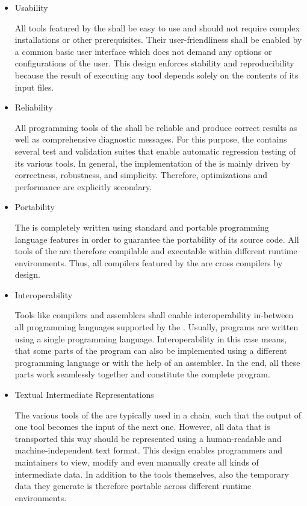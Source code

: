 \begin{itemize}

\item Usability\nopagebreak

All tools featured by the \ecs{} shall be easy to use and should not require complex installations or other prerequisites.
Their user-friendliness shall be enabled by a common basic user interface which does not demand any options or configurations of the user.
This design enforces stability and reproducibility because the result of executing any tool depends solely on the contents of its input files.

\item Reliability\nopagebreak

All programming tools of the \ecs{} shall be reliable and produce correct results as well as comprehensive diagnostic messages.
For this purpose, the \ecs{} contains several test and validation suites that enable automatic regression testing of its various tools.
In general, the implementation of the \ecs{} is mainly driven by correctness, robustness, and simplicity.
Therefore, optimizations and performance are explicitly secondary.

\item Portability\nopagebreak

The \ecs{} is completely written using standard and portable programming language features in order to guarantee the portability of its source code.
All tools of the \ecs{} are therefore compilable and executable within different runtime environments.
Thus, all compilers featured by the \ecs{} are cross compilers by design.

\item Interoperability\nopagebreak

Tools like compilers and assemblers shall enable interoperability in-between all programming languages supported by the \ecs{}.
Usually, programs are written using a single programming language.
Interoperability in this case means, that some parts of the program can also be implemented using a different programming language or with the help of an assembler.
In the end, all these parts work seamlessly together and constitute the complete program.

\item Textual Intermediate Representations\nopagebreak

The various tools of the \ecs{} are typically used in a chain, such that the output of one tool becomes the input of the next one.
However, all data that is transported this way should be represented using a human-readable and machine-independent text format.
This design enables programmers and maintainers to view, modify and even manually create all kinds of intermediate data.
In addition to the tools themselves, also the temporary data they generate is therefore portable across different runtime environments.


\end{itemize}
